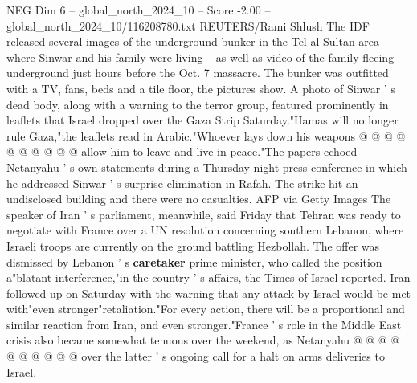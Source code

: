 \begin{textsample}{NEG Dim 6 – global\_north\_2024\_10 – Score -2.00 – global\_north\_2024\_10/116208780.txt}
REUTERS/Rami Shlush The IDF released several images of the underground bunker in the Tel al-Sultan area where Sinwar and his family were living -- as well as video of the family fleeing underground just hours before the Oct. 7 massacre.
The bunker was outfitted with a TV, fans, beds and a tile floor, the pictures show.
A photo of Sinwar ' s dead body, along with a warning to the terror group, featured prominently in leaflets that Israel dropped over the Gaza Strip Saturday."Hamas will no longer rule Gaza,"the leaflets read in Arabic."Whoever lays down his weapons @ @ @ @ @ @ @ @ @ @ allow him to leave and live in peace."The papers echoed Netanyahu ' s own statements during a Thursday night press conference in which he addressed Sinwar ' s surprise elimination in Rafah.
The strike hit an undisclosed building and there were no casualties.
AFP via Getty Images The speaker of Iran ' s parliament, meanwhile, said Friday that Tehran was ready to negotiate with France over a UN resolution concerning southern Lebanon, where Israeli troops are currently on the ground battling Hezbollah.
The offer was dismissed by Lebanon ' s \textbf{caretaker} prime minister, who called the position a"blatant interference,"in the country ' s affairs, the Times of Israel reported.
Iran followed up on Saturday with the warning that any attack by Israel would be met with"even stronger"retaliation."For every action, there will be a proportional and similar reaction from Iran, and even stronger."France ' s role in the Middle East crisis also became somewhat tenuous over the weekend, as Netanyahu @ @ @ @ @ @ @ @ @ @ over the latter ' s ongoing call for a halt on arms deliveries to Israel.

\end{textsample}
